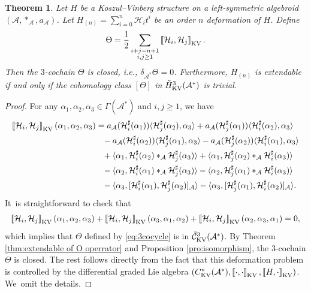 \documentclass[10pt,a4paper]{amsart}
\numberwithin{equation}{section}
\newtheorem{thm}{Theorem}[section]
\newcommand{\huaA}{\mathcal{A}}
\newcommand{\huaC}{\mathcal{C}}
\newcommand{\huaH}{\mathcal{H}}
\newcommand{\Courant}[1]{\left[\!\left[ #1\right]\!\right]}
\newcommand{\half}{\frac{1}{2}}
\begin{document}
\begin{thm}
Let $H$ be a Koszul--Vinberg structure on a left-symmetric algebroid $(\huaA,\ast_\huaA,a_\huaA)$. Let $H_{(n)}=\sum_{i=0}^{n}\huaH_it^i$ be an order $n$ deformation of $H$. Define\vspace{-.5ex}
 \begin{gather}\label{eq:3cocycle}
 \Theta=\half\sum_{\substack{i+j=n+1\\ i,j\geq1}}\Courant{\huaH_i,\huaH_j}_{\rm KV}.
 \end{gather}
 Then the $3$-cochain $\Theta$ is closed, i.e., $\delta_{\huaA^*}\Theta=0$. Furthermore, $H_{(n)}$ is {extendable} if and only if the cohomology class $[\Theta]$ in $\tilde{H}_{\rm KV}^3(\huaA^*)$ is trivial.
\end{thm}
\begin{proof}
	For any $ \alpha_1,\alpha_2,\alpha_3\in\Gamma(\huaA^*)$ and $i,j\geq 1$, we have
\begin{align*}%
\Courant{\huaH_i,\huaH_j}_{\rm KV}(\alpha_1,\alpha_2,\alpha_3)
&=a_\huaA(\huaH^\sharp_i(\alpha_1))\langle \huaH^\sharp_j(\alpha_2),\alpha_3\rangle+a_\huaA(\huaH^\sharp_j(\alpha_1))\langle \huaH^\sharp_i(\alpha_2),\alpha_3\rangle
\\
&\phantom{=}-a_\huaA(\huaH^\sharp_i(\alpha_2))\langle \huaH^\sharp_j(\alpha_1),\alpha_3\rangle
-a_\huaA(\huaH^\sharp_j(\alpha_2))\langle \huaH^\sharp_i(\alpha_1),\alpha_3\rangle
\\
&\phantom{=}+\langle \alpha_1,\huaH^\sharp_i(\alpha_2)\ast_\huaA \huaH^\sharp_j(\alpha_3)\rangle +\langle \alpha_1,\huaH^\sharp_j(\alpha_2)\ast_\huaA \huaH^\sharp_i(\alpha_3)\rangle \\
&\phantom{=}-\langle\alpha_2,\huaH^\sharp_i(\alpha_1)\ast_\huaA \huaH^\sharp_j(\alpha_3)\rangle-\langle\alpha_2,\huaH^\sharp_j(\alpha_1)\ast_\huaA \huaH^\sharp_i(\alpha_3)\rangle
\\
&\phantom{=}-\langle \alpha_3,[\huaH^\sharp_i(\alpha_1),
\huaH^\sharp_j(\alpha_2)]_\huaA\rangle
-\langle \alpha_3,[\huaH^\sharp_j(\alpha_1),
\huaH^\sharp_i(\alpha_2)]_\huaA\rangle.
\end{align*}
It~is straightforward to	check that\vspace{-.5ex}
\begin{gather*}
\Courant{\huaH_i,\huaH_j}_{\rm KV}(\alpha_1,\alpha_2,\alpha_3)+ \Courant{\huaH_i,\huaH_j}_{\rm KV}(\alpha_3,\alpha_1,\alpha_2)+\Courant{\huaH_i,\huaH_j}_{\rm KV}(\alpha_2,\alpha_3,\alpha_1)=0,
\end{gather*}
which implies that $\Theta$ defined by \eqref{eq:3cocycle} is in $\tilde{\huaC}_{\rm KV}^3(\huaA^*)$. By Theorem \ref{thm:extendable of O operrator} and Proposition \ref{pro:isomorphism}, the $3$-cochain $\Theta$ is closed. The rest follows directly from the fact that this deformation problem is controlled by the differential graded Lie algebra $(C_{\rm KV}^{*}(\huaA^*),\Courant{\cdot,\cdot}_{\rm KV},\Courant{H,\cdot}_{\rm KV})$. We~omit the details.\vspace{-1ex}
	\end{proof}	
\end{document}
